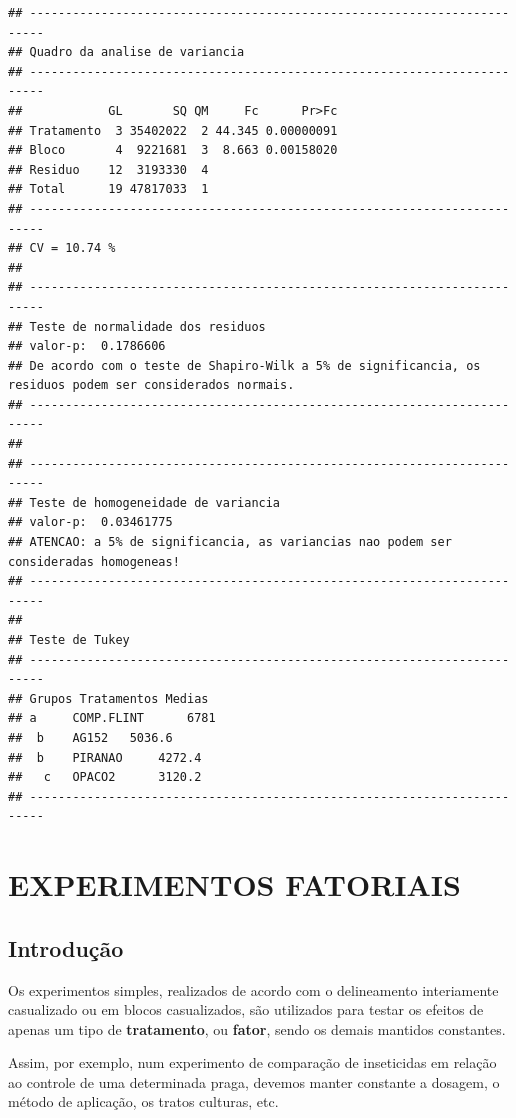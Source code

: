 \documentclass[
]{book}
\begin{document}
\begin{verbatim}
## ------------------------------------------------------------------------
## Quadro da analise de variancia
## ------------------------------------------------------------------------
##            GL       SQ QM     Fc      Pr>Fc
## Tratamento  3 35402022  2 44.345 0.00000091
## Bloco       4  9221681  3  8.663 0.00158020
## Residuo    12  3193330  4                  
## Total      19 47817033  1                  
## ------------------------------------------------------------------------
## CV = 10.74 %
## 
## ------------------------------------------------------------------------
## Teste de normalidade dos residuos 
## valor-p:  0.1786606 
## De acordo com o teste de Shapiro-Wilk a 5% de significancia, os residuos podem ser considerados normais.
## ------------------------------------------------------------------------
## 
## ------------------------------------------------------------------------
## Teste de homogeneidade de variancia 
## valor-p:  0.03461775 
## ATENCAO: a 5% de significancia, as variancias nao podem ser consideradas homogeneas!
## ------------------------------------------------------------------------
## 
## Teste de Tukey
## ------------------------------------------------------------------------
## Grupos Tratamentos Medias
## a     COMP.FLINT      6781 
##  b    AG152   5036.6 
##  b    PIRANAO     4272.4 
##   c   OPACO2      3120.2 
## ------------------------------------------------------------------------
\end{verbatim}

\hypertarget{experimentos-fatoriais}{%
\chapter{EXPERIMENTOS FATORIAIS}\label{experimentos-fatoriais}}

\hypertarget{introduuxe7uxe3o-1}{%
\section{Introdução}\label{introduuxe7uxe3o-1}}

Os experimentos simples, realizados de acordo com o delineamento interiamente casualizado ou em blocos casualizados, são utilizados para testar os efeitos de apenas um tipo de \textbf{tratamento}, ou \textbf{fator}, sendo os demais mantidos constantes.

Assim, por exemplo, num experimento de comparação de inseticidas em relação ao controle de uma determinada praga, devemos manter constante a dosagem, o método de aplicação, os tratos culturas, etc.
\end{document}
